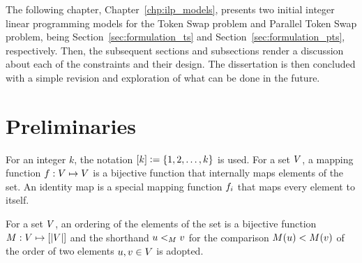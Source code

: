 \documentclass[msc,english,table,xcdraw]{ppgccufmg}
\begin{document}

The following chapter, Chapter~\ref{chp:ilp_models}, presents two initial integer 
linear programming models for the Token Swap problem and Parallel Token
Swap problem, being Section~\ref{sec:formulation_ts} and Section~\ref{sec:formulation_pts},
respectively.
Then, the subsequent sections and subsections render a discussion about each of 
the constraints and their design.
The dissertation is then concluded with a simple revision and exploration of 
what can be done in the future.

\section{Preliminaries}
\label{sec:intro:prelim}


For an integer $k$, the notation $[k] \vcentcolon= \{1, 2, 
\ldots, k\}$ is used. For a set $V$, a mapping function $f : V \mapsto V$ is a bijective function that internally maps
elements of the set.
An identity map is a special mapping function $f_{i}$ that maps every element
to itself. 


For a set $V$, an ordering of the elements of the set is a bijective 
function $M : V \mapsto [|V|]$ and the shorthand $u <_{M} v$ for the comparison $
M(u) < M(v)$ of the order of 
two elements $u,v\in V$ is adopted.

\end{document}
